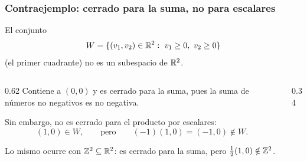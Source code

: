 \begin{frame}
    \frametitle{Contraejemplo: cerrado para la suma, no para escalares}

    \begin{example}
        El conjunto
        \[
            W=\{(v_1,v_2)\in\R^2:\ v_1\geq0,\ v_2\geq0\}
        \]
        (el primer cuadrante) \alert{no} es un subespacio de $\mathbb{R}^2$.
    \end{example}

    \begin{columns}[T]
        \begin{column}{0.62\textwidth}
            Contiene a $(0,0)$ y es cerrado para la suma, pues la suma de números
            no negativos es no negativa.

            \medskip

            Sin embargo, no es cerrado para el producto por escalares:
            \[
                (1,0)\in W,
                \qquad\text{pero}\qquad
                (-1)(1,0)=(-1,0)\notin W.
            \]

            Lo mismo ocurre con $\mathbb{Z}^2\subseteq\mathbb{R}^2$: es cerrado para la suma,
            pero $\tfrac12(1,0)\notin\mathbb{Z}^2$.
        \end{column}
        \begin{column}{0.34\textwidth}
            \centering
        \end{column}
    \end{columns}
\end{frame}

